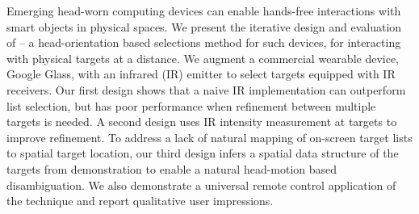 
Emerging head-worn computing devices can enable hands-free interactions with smart objects in physical spaces. 
%
We present the iterative design and evaluation of \systemname -- a head-orientation based selections method for such devices, for interacting with physical targets at a distance. We augment a commercial wearable device, Google Glass, with an infrared (IR) emitter to select targets equipped with IR receivers. Our first design shows that a naive IR implementation can outperform list selection, but has poor performance when refinement between multiple targets is needed. A second design uses IR intensity measurement at targets to improve refinement. To address a lack of natural mapping of on-screen target lists to spatial target location, our third design infers a spatial data structure of the targets from demonstration to enable a natural head-motion based disambiguation.
%
We also demonstrate a universal remote control application of the technique and report qualitative user impressions.